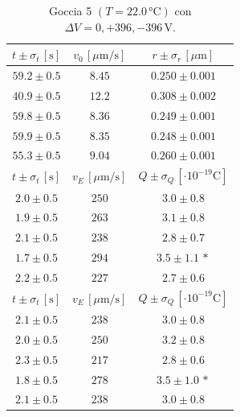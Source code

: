 \documentclass[]{article}
\begin{document}
    \begin{table}[H]
        \centering
        \begin{tabular}{||c|c|c||}
            \hline
            $t \pm \sigma_t \, \left[\text{s}\right]$ & $v_0 \, \left[\mu\text{m/s}\right]$ & $r \pm \sigma_r \, \left[\mu\text{m}\right]$ \\\hline
            \hline
            $59.2 \pm 0.5$ & $8.45$ & $0.250 \pm 0.001$ \\\hline
            $40.9 \pm 0.5$ & $12.2$ & $0.308 \pm 0.002$ \\\hline
            $59.8 \pm 0.5$ & $8.36$ & $0.249 \pm 0.001$ \\\hline
            $59.9 \pm 0.5$ & $8.35$ & $0.248 \pm 0.001$ \\\hline
            $55.3 \pm 0.5$ & $9.04$ & $0.260 \pm 0.001$ \\\hline
            \hline
            $t \pm \sigma_t \, \left[\text{s}\right]$ & $v_E \, \left[\mu\text{m/s}\right]$ & $Q \pm \sigma_Q \, \left[\cdot 10^{-19} \text{C}\right]$ \\\hline
            \hline
            $2.0 \pm 0.5$ & $250$ & $3.0 \pm 0.8$ \\\hline
            $1.9 \pm 0.5$ & $263$ & $3.1 \pm 0.8$ \\\hline
            $2.1 \pm 0.5$ & $238$ & $2.8 \pm 0.7$ \\\hline
            $1.7 \pm 0.5$ & $294$ & $3.5 \pm 1.1\,\ast$ \\\hline
            $2.2 \pm 0.5$ & $227$ & $2.7 \pm 0.6$ \\\hline
            \hline
            $t \pm \sigma_t \, \left[\text{s}\right]$ & $v_E \, \left[\mu\text{m/s}\right]$ & $Q \pm \sigma_Q \, \left[\cdot 10^{-19} \text{C}\right]$ \\\hline
            \hline
            $2.1 \pm 0.5$ & $238$ & $3.0 \pm 0.8$ \\\hline
            $2.0 \pm 0.5$ & $250$ & $3.2 \pm 0.8$ \\\hline
            $2.3 \pm 0.5$ & $217$ & $2.8 \pm 0.6$ \\\hline
            $1.8 \pm 0.5$ & $278$ & $3.5 \pm 1.0\,\ast$ \\\hline
            $2.1 \pm 0.5$ & $238$ & $3.0 \pm 0.8$ \\\hline
        \end{tabular}
        \caption{Goccia 5 $\left(T = 22.0\, \text{°C}\right)$ con $\Delta V = 0,+396,-396 \,\text{V}$.}
        \label{goccia-5}
    \end{table}
\end{document}
